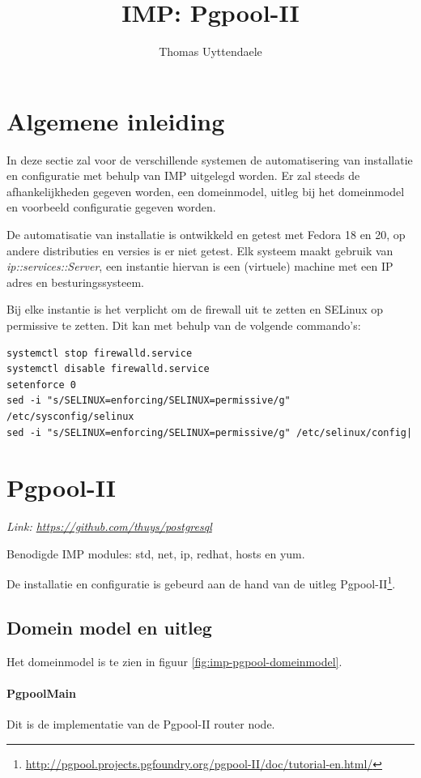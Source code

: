 \documentclass[]{article}
\title{IMP: Pgpool-II}
\author{Thomas Uyttendaele}
\begin{document}
\maketitle
\section{Algemene inleiding}
In deze sectie zal voor de verschillende systemen de automatisering van installatie en configuratie met behulp van IMP uitgelegd worden. Er zal steeds de afhankelijkheden gegeven worden, een domeinmodel, uitleg bij het domeinmodel en voorbeeld configuratie gegeven worden. 

De automatisatie van installatie is ontwikkeld en getest met Fedora 18 en 20, op andere distributies en versies is er niet getest. 
Elk systeem maakt gebruik van \textit{ip::services::Server}, een instantie hiervan is een (virtuele) machine met een IP adres en besturingssysteem. 

Bij elke instantie is het verplicht om de firewall uit te zetten en SELinux op permissive te zetten. Dit kan met behulp van de volgende commando's: 
\begin{lstlisting}[frame=single, breaklines=true]
systemctl stop firewalld.service  
systemctl disable firewalld.service  
setenforce 0
sed -i "s/SELINUX=enforcing/SELINUX=permissive/g" /etc/sysconfig/selinux
sed -i "s/SELINUX=enforcing/SELINUX=permissive/g" /etc/selinux/config|
\end{lstlisting}

\section{Pgpool-II}
\textit{Link: \url{https://github.com/thuys/postgresql}}

Benodigde IMP modules: std, net, ip, redhat, hosts en yum. 

De installatie en configuratie is gebeurd aan de hand van de uitleg Pgpool-II\footnote{\url {http://pgpool.projects.pgfoundry.org/pgpool-II/doc/tutorial-en.html/}}. 

\subsection{Domein model en uitleg}
Het domeinmodel is te zien in figuur \ref{fig:imp-pgpool-domeinmodel}.

	\paragraph{PgpoolMain} Dit is de implementatie van de Pgpool-II router node. 
	
\end{document}
